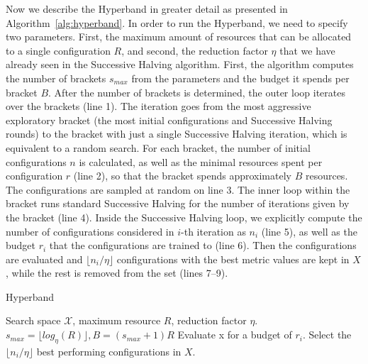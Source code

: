 Now we describe the Hyperband in greater detail as presented in Algorithm~\ref{alg:hyperband}. In order to run the Hyperband, we need to specify two parameters. First, the maximum amount of resources that can be allocated to a single configuration $R$, and second, the reduction factor $\eta$ that we have already seen in the Successive Halving algorithm. First, the algorithm computes the number of brackets $s_{max}$ from the parameters and the budget it spends per bracket $B$. After the number of brackets is determined, the outer loop iterates over the brackets (line 1). The iteration goes from the most aggressive exploratory bracket (the most initial configurations and Successive Halving rounds) to the bracket with just a single Successive Halving iteration, which is equivalent to a random search. For each bracket, the number of initial configurations $n$ is calculated, as well as the minimal resources spent per configuration $r$ (line 2), so that the bracket spends approximately $B$ resources. The configurations are sampled at random on line 3. The inner loop within the bracket runs standard Successive Halving for the number of iterations given by the bracket (line 4). Inside the Successive Halving loop, we explicitly compute the number of configurations considered in $i$-th iteration as $n_i$ (line 5), as well as the budget $r_i$ that the configurations are trained to (line 6). Then the configurations are evaluated and $ \lfloor n_i/\eta \rfloor$ configurations with the best metric values are kept in $X$, while the rest is removed from the set (lines 7--9).

\begin{algorithm}
    \caption{Hyperband}
    \begin{algorithmic}[1]
     Search space $\mathcal{X}$,\hspace{1mm} maximum resource $R$,\hspace{1mm} reduction factor $\eta$.
     $s_{max} = \lfloor log_\eta (R) \rfloor , B=(s_{max}+1)R$
                \State Evaluate x for a budget of $r_i$.
            \EndFor
        \State Select the $\lfloor n_i/\eta \rfloor $ best performing configurations in $X$.
        \EndFor
    \EndFor
    \State {}
    \end{algorithmic}
    \label{alg:hyperband}
\end{algorithm}

